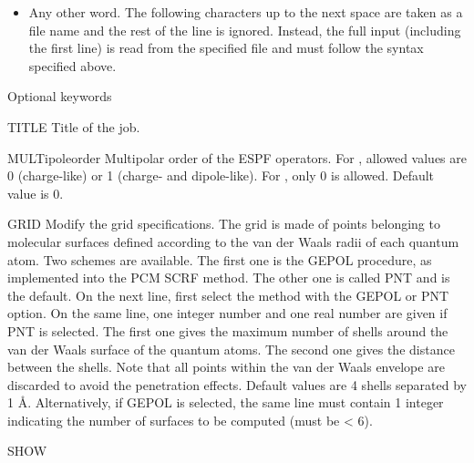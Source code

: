 \begin{keywordlist}
\begin{itemize}
\item Any other word. The following characters up to the next space are taken as a file name and the rest of the line is ignored. Instead, the full input (including the first line) is read from the specified file and must follow the syntax specified above.
\end{itemize}
\end{keywordlist}

Optional keywords
\begin{keywordlist}
\item[TITLE]
Title of the job.
\item[MULTipoleorder]
Multipolar order of the ESPF operators. For , allowed values are 0 (charge-like) or 1 (charge- and dipole-like). For , only 0 is allowed. Default value is 0.
\item[GRID]
Modify the grid specifications. The grid is made of points belonging to molecular surfaces defined according to the van der Waals radii of each quantum atom. Two schemes are available. The first one is the GEPOL procedure, as implemented into the PCM SCRF method. The other one is called PNT and is the default. On the next line, first select the method with the GEPOL or PNT option. On the same line, one integer number and one real number are given if PNT is selected. The  first one gives the maximum number of shells around the van der Waals surface of the quantum atoms. The second one gives the distance between the shells. Note that all points within the van der Waals envelope are discarded to avoid the penetration effects. Default values are 4 shells separated by 1 \AA.
Alternatively, if GEPOL is selected, the same line must contain 1 integer indicating the number of surfaces to be computed (must be < 6).
\item[SHOW]

\end{keywordlist}
